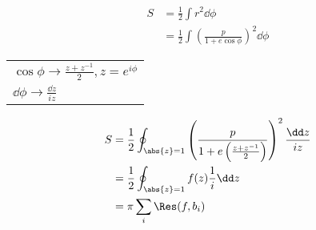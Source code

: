 \begin{equation*}
	\begin{aligned}
		S &= \frac{1}{2}\int r^2 \dd \phi \\
&= \frac{1}{2}\int \left(\frac{p}{1 + e \cos \phi} \right)^2 \dd \phi
	\end{aligned}
\end{equation*}
\begin{tabular}{l}
\(\cos\phi \to \frac{z + z^{-1}}{2}, z=e^{i \phi} \) \\
\(\dd \phi \to \frac{\dd z}{i z}\)
\end{tabular}	
\begin{equation*}
	\begin{aligned}
		S &= \frac{1}{2}\oint_{\abs{z}=1} \left(\frac{p}{1 + e \left(\frac{z + z^{-1}}{2}\right)} \right)^2 \frac{\dd z}{i z}\\
			&= \frac{1}{2} \oint_{\abs{z}=1} f(z) \frac{1}{i} \dd z \\
			&= \pi \sum_i \Res(f, b_i)
	\end{aligned}
\end{equation*}

